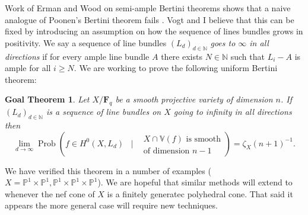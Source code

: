 \documentclass[11pt,reqno]{amsart}
\newtheorem{goalTheorem}[lemma]{Goal Theorem}
\newtheorem{conj}[lemma]{Conjecture}
\theoremstyle{remark}
\newcommand{\Prob}{\operatorname{Prob}}
\newcommand{\Nef}{\operatorname{Nef}}
\newcommand{\fF}{\mathbf F}
\newcommand{\cD}{\mathcal{D}}
\newcommand{\cL}{\mathcal{L}}
\newcommand{\N}{\mathbb{N}}
\renewcommand{\P}{\mathbb{P}}
\newcommand{\V}{\mathbb{V}}
\begin{document}
Work of Erman and Wood on semi-ample Bertini theorems shows that a naive analogue of Poonen's Bertini theorem fails \cite{ermanWood15}. Vogt and I believe that this can be fixed by introducing an assumption on how the sequence of lines bundles grows in positivity. We say a sequence of line bundles  $\left(L_{d}\right)_{d\in\N}$ \textit{goes to $\infty$ in all directions} if for every ample line bundle $A$ there exists $N\in \N$ such that $L_{i}-A$ is ample for all $i\geq N$. We are working to prove the following uniform Bertini theorem:
 
\begin{goalTheorem}\label{gthm:effective-bertini}
Let $X/\fF_{q}$ be a smooth projective variety of dimension $n$. If $\left(L_{d}\right)_{d\in\N}$ is a sequence of line bundles on $X$ going to infinity in all directions then 
\begin{equation}
\lim_{d\to \infty} \Prob\left(f \in H^0\left(X, L_{d}\right)  \;\;\; \bigg| \;\;\; 
\begin{matrix}
 \text{$X\cap\V(f)$ is smooth}\\
 \text{of dimension $n-1$}
 \end{matrix}
\right)=
\zeta_X(n+1)^{-1}.
\end{equation}
\end{goalTheorem}

We have verified this theorem in a number of examples ($X=\P^1\times\P^1, \P^1\times\P^1\times\P^1$). We  are hopeful that similar methods will extend to whenever the nef cone of $X$ is a finitely generatec polyhedral cone. That said it appears the more general case  will require new techniques. 

%
%
%
 
\end{document}
